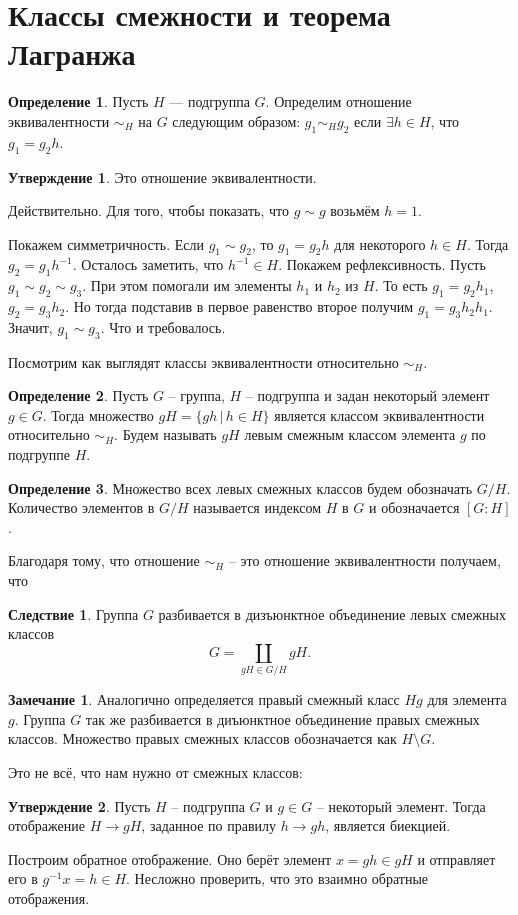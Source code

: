 \documentclass[10pt,a4paper,oneside]{book}
\theoremstyle{definition}
\newtheorem*{rem}{\color{green!50!blue}Замечание}
\newtheorem*{defn}{\color{yellow!30!red} Определение}
\newtheorem{cor}{\color{green!45!black}Следствие}
\newtheorem{utvr}{\color{blue!50!black}Утверждение}
\def\dfn{\begin{defn}}
\def\edfn{\end{defn}}
\def\crl{\begin{cor}}
\def\ecrl{\end{cor}}
\def\rm{\begin{rem}}
\def\erm{\end{rem}}
\def\utv{\begin{utvr}}
\def\eutv{\end{utvr}}
\begin{document}
\section{Классы смежности и теорема Лагранжа}

\dfn Пусть $H$ --- подгруппа $G$. Определим отношение эквивалентности $\sim_H$ на $G$ следующим образом: $g_1\sim_H g_2$ если $\exists h \in H$, что $g_1=g_2 h$.
\edfn

\utv Это отношение эквивалентности.
\eutv
\proof Действительно. Для того, чтобы показать, что $g\sim g$ возьмём $h=1$. 

Покажем симметричность. Если $g_1 \sim g_2$, то $g_1=g_2h$ для некоторого $h\in H$. Тогда $g_2=g_1h^{-1}$. Осталось заметить, что $h^{-1}\in H$. Покажем рефлексивность. Пусть $g_1\sim g_2 
\sim g_3$. При этом помогали им элементы $h_1$ и $h_2$ из $H$. То есть $g_1=g_2h_1$, $g_2=g_3h_2$. Но тогда подставив в первое равенство второе получим $g_1=g_3h_2h_1$. Значит, $g_1\sim g_3$. Что и требовалось. 
\endproof

Посмотрим как выглядят классы эквивалентности относительно $\sim_H$.

\dfn Пусть $G$ -- группа, $H$ -- подгруппа и задан некоторый элемент $g\in G$. Тогда множество $gH=\{ gh\,|\, h \in H\}$ является классом эквивалентности относительно $\sim_H$. Будем называть $gH$ левым смежным  классом элемента $g$ по подгруппе $H$. 
\edfn

\dfn Множество всех левых смежных классов будем обозначать $G/H$. Количество элементов в $G/H$ называется индексом $H$ в $G$  и обозначается $[G:H]$. 
\edfn

Благодаря тому, что отношение $\sim_H$ -- это отношение эквивалентности получаем, что



\crl Группа $G$ разбивается в дизъюнктное объединение левых смежных классов $$G=\coprod_{ gH \in G/H} gH.$$
\ecrl




\rm Аналогично определяется правый смежный класс $Hg$ для элемента $g$. Группа $G$ так же разбивается в диъюнктное объединение правых смежных классов. Множество правых смежных классов обозначается как $H\setminus G$.
\erm 

Это не всё, что нам нужно от смежных классов:

\utv Пусть $H$ -- подгруппа $G$ и $g\in G$ -- некоторый элемент. Тогда отображение $H \to gH$, заданное по правилу $h \to gh$, является биекцией.
\eutv
\proof Построим обратное отображение. Оно берёт элемент $x=gh\in gH$ и отправляет его в $g^{-1}x=h \in H $. Несложно проверить, что это взаимно обратные отображения.
\endproof
\end{document}
